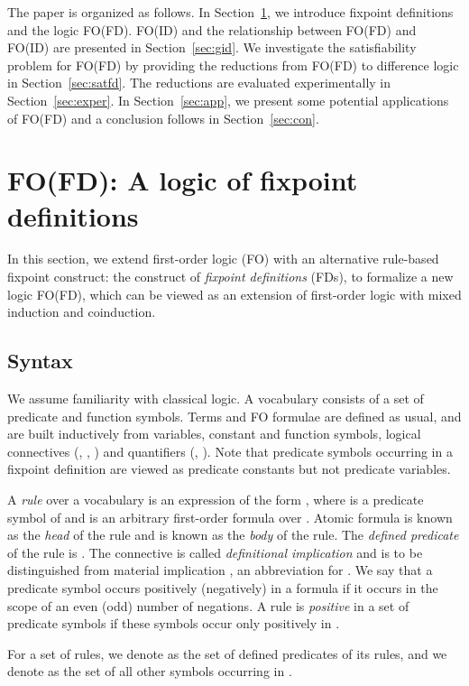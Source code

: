 \documentclass{tlp}
\begin{document}
The paper is organized as follows. In Section~\ref{sec:fd}, we introduce fixpoint definitions and the logic FO(FD). FO(ID) and the relationship between FO(FD) and FO(ID) are presented in Section~\ref{sec:gid}. We investigate the satisfiability problem for FO(FD) by providing the reductions from FO(FD) to difference logic in Section~\ref{sec:satfd}. The reductions are evaluated experimentally in Section~\ref{sec:exper}. In Section~\ref{sec:app}, we present some potential applications of FO(FD) and a conclusion follows in Section~\ref{sec:con}.
\section{FO(FD): A logic of fixpoint definitions}\label{sec:fd}


In this section, we extend first-order logic (FO) with an alternative rule-based fixpoint construct: the construct of {\em fixpoint definitions} (FDs), to formalize a new logic FO(FD), which can be viewed as an extension of first-order logic with mixed induction and coinduction.

\subsection{Syntax}


We assume familiarity with classical logic. A vocabulary  consists of a set of predicate and function symbols.
Terms and FO formulae are defined as usual, and are built inductively from variables, constant and function symbols, logical connectives (, , ) and quantifiers (, ). Note that predicate symbols occurring in a fixpoint definition are viewed as predicate constants but not predicate variables.

A {\em rule} over a vocabulary  is an expression of the form , where  is a predicate symbol of  and  is an arbitrary first-order formula over . Atomic formula  is known as the {\em head} of the rule and  is known as the {\em body} of the rule. The {\em defined predicate} of the rule is . The connective  is called {\em definitional implication} and is to be distinguished from material implication , an abbreviation for . We say that a predicate symbol occurs positively (negatively) in a formula if it occurs in the scope of an even (odd) number of negations. A rule is {\em positive} in a set of predicate symbols if these symbols occur only positively in .

For a set  of rules, we denote  as the set of defined predicates of its rules, and we denote  as the set of all other symbols occurring in .
\end{document}
